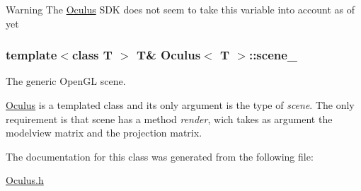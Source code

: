 \begin{DoxyWarning}{Warning}
The \hyperlink{classOculus}{Oculus} S\+D\+K does not seem to take this variable into account as of yet 
\end{DoxyWarning}
\hypertarget{classOculus_a8a88e3b8bb25831c6fb001fbdac6b45b}{}
\subsubsection[{scene\+\_\+}]{\setlength{\rightskip}{0pt plus 5cm}template$<$class T $>$ T\& {\bf Oculus}$<$ T $>$\+::scene\+\_\+\hspace{0.3cm}{\ttfamily [protected]}}\label{classOculus_a8a88e3b8bb25831c6fb001fbdac6b45b}


The generic Open\+G\+L scene. 

\hyperlink{classOculus}{Oculus} is a templated class and its only argument is the type of {\itshape scene}. The only requirement is that scene has a method {\itshape render}, wich takes as argument the modelview matrix and the projection matrix. 

The documentation for this class was generated from the following file\+:\begin{DoxyCompactItemize}
\item 
\hyperlink{Oculus_8h}{Oculus.\+h}\end{DoxyCompactItemize}
